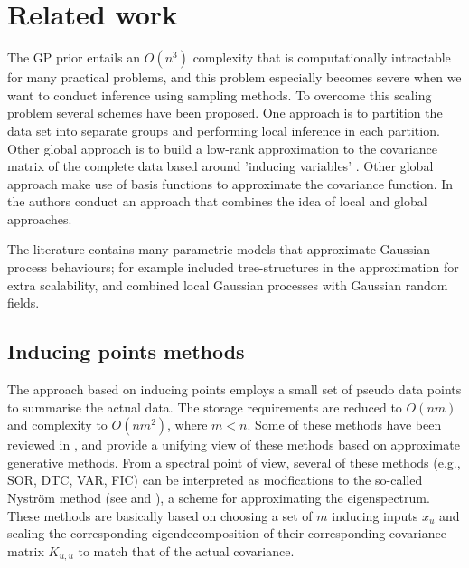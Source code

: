 \documentclass[]{interact}
\theoremstyle{plain}%
\theoremstyle{definition}
\theoremstyle{remark}
\begin{document}
\vspace{3mm}
\appendix

\section{Related work}

The GP prior entails an $O(n^3)$ complexity that is computationally intractable for many practical problems, and this problem especially becomes severe when we want to conduct inference using sampling methods. To overcome this scaling problem several schemes have been proposed. One approach is to partition the data set into separate groups \citep{snelson2007local, urtasun2008sparse} and performing local inference in each partition. Other global approach is to build a low-rank approximation to the covariance matrix of the complete data based around 'inducing variables' \citep{quinonero2005unifying,bui2017unifying}. Other global approach make use of basis functions to approximate the covariance function. In \cite{snelson2007local} the authors conduct an approach that combines the idea of local and global approaches.

The literature contains many parametric models that approximate Gaussian process behaviours; for example \cite{bui2014tree} included  tree-structures in the approximation for extra scalability, and \cite{moore2015gaussian} combined local Gaussian
processes with Gaussian random fields.

\subsection{Inducing points methods}

The approach based on inducing points employs a small set of pseudo data points to summarise the actual data. The storage requirements are reduced to $O(nm)$ and complexity to $O(nm^2)$, where $m < n$. Some of these methods have been reviewed in \cite{rasmussen2006gaussian}, and \cite{quinonero2005unifying} provide a unifying view of these methods based on approximate generative methods. From a spectral point of view, several of these methods (e.g., SOR, DTC, VAR, FIC) can be interpreted as modfications to the so-called Nystr{\"o}m method (see \cite{arthur1979baker} and \cite{williams2001using}), a scheme for approximating the eigenspectrum. These methods are basically based on choosing a set of $m$ inducing inputs $x_u$ and scaling the corresponding eigendecomposition of their corresponding covariance matrix $K_{u,u}$ to match that of the actual covariance. 
\end{document}
